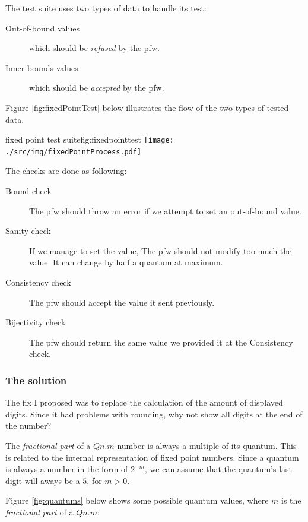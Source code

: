 The test suite uses two types of data to handle its test:
\begin{description}
    \item[Out-of-bound values] which should be \emph{refused} by the \gls{pfw}.
    \item[Inner bounds values] which should be \emph{accepted} by the \gls{pfw}.
\end{description}

Figure \ref{fig:fixedPointTest} below illustrates the flow of the two types of tested data.

\begin{figureGraphics}{fixed point test suite}{fig:fixedpointtest}
    \texttt{[image: ./src/img/fixedPointProcess.pdf]}
\end{figureGraphics}

The checks are done as following:
\begin{description}
    \item[Bound check] The \gls{pfw} should throw an error if we
        attempt to set an out-of-bound value.
    \item[Sanity check] If we manage to set the value, The \gls{pfw} should not modify too much
        the value. It can change by half a quantum at maximum.
    \item[Consistency check] The \gls{pfw} should accept the value it sent previously.
    \item[Bijectivity check] The \gls{pfw} should return the same value we provided it at the Consistency check.
\end{description}

\subsubsection{The solution}
The fix I proposed was to replace the calculation of the amount of displayed digits.
Since it had problems with rounding, why not show all digits at the end of the number?

The \emph{fractional part} of a $Qn.m$ number is always a multiple of its quantum. This is related to
the internal representation of fixed point numbers. Since a quantum is always a number in the form of $2^{-m}$, we can
assume that the quantum's last digit will aways be a $5$, for $m > 0$.

Figure \ref{fig:quantums} below shows some possible quantum values, where $m$ is the \emph{fractional part} of a $Qn.m$:

